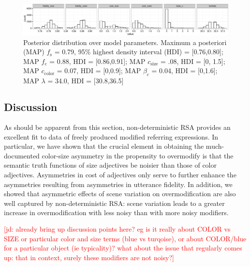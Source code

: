 \documentclass[11pt]{article}
\newcommand{\jd}[1]{\textcolor{Red}{[jd: #1]}}
\begin{document}
\begin{figure}
\centering
\includegraphics[width=\textwidth]{../../../models/1a_bda_basic/results_bda/graphs/parameterposteriors-fixed-reducedconditions-unlogged}
\caption{Posterior distribution over model parameters. Maximum a posteriori (MAP)  $f_{\textrm{s}}$ = 0.79, 95\% highest density interval (HDI) = [0.76,0.80]; MAP $f_{\textrm{c}}$ = 0.88, HDI = [0.86,0.91]; MAP $c_{\textrm{size}}$ = .08, HDI = [0, 1.5]; MAP $c_{\textrm{color}}$ = 0.07, HDI = [0,0.9]; MAP $\beta_c$ = 0.04, HDI = [0,1.6]; MAP $\lambda$ = 34.0, HDI = [30.8,36.5]}
\label{fig:modifierparamposteriors}
\end{figure}

\subsection{Discussion}
\label{sec:modifierdiscussion}

As should be apparent from this section, non-deterministic RSA provides an excellent fit to data of freely produced modified referring expressions. In particular, we have shown that the crucial element in obtaining the much-documented color-size asymmetry in the propensity to overmodify is that the semantic truth functions of size adjectives be noisier than those of color adjectives. Asymmetries in cost of adjectives  only serve to further enhance the asymmetries resulting from asymmetries in utterance fidelity. In addition, we showed that asymmetric effects of scene variation on overmodification are also well captured by non-deterministic RSA: scene variation leads to a greater increase in overmodification with less noisy than with more noisy modifiers.



\jd{already bring up discussion points here? eg is it really about COLOR vs SIZE or particular color and size terms (blue vs turqoise), or about COLOR/blue for a particular object (ie typicality)? what about the issue that regularly comes up: that in context, surely these modifiers are not noisy?}
\end{document}
